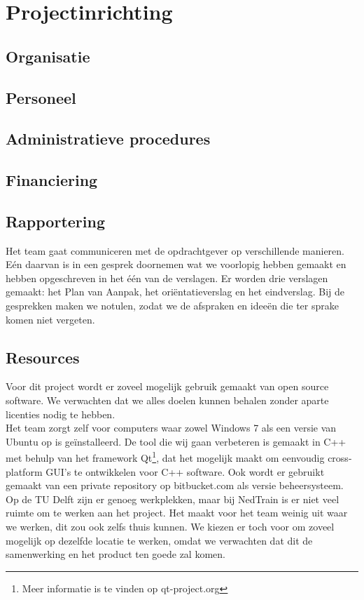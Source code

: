 \section{Projectinrichting}
\subsection{Organisatie}
\subsection{Personeel}
\subsection{Administratieve procedures}
\subsection{Financiering}
\subsection{Rapportering}
Het team gaat communiceren met de opdrachtgever op verschillende manieren. E\'en daarvan is in een gesprek doornemen wat we voorlopig hebben gemaakt en hebben opgeschreven in het \'e\'en van de verslagen. Er worden drie verslagen gemaakt: het Plan van Aanpak, het ori\"entatieverslag en het eindverslag. Bij de gesprekken maken we notulen, zodat we de afspraken en idee\"en die ter sprake komen niet vergeten.

\subsection{Resources}
Voor dit project wordt er zoveel mogelijk gebruik gemaakt van open source software. We verwachten dat we alles doelen kunnen behalen zonder aparte licenties nodig te hebben. \\

Het team zorgt zelf voor computers waar zowel Windows 7 als een versie van Ubuntu op is ge\"installeerd. De tool die wij gaan verbeteren is gemaakt in C++ met behulp van het framework Qt\footnote{Meer informatie is te vinden op qt-project.org}, dat het mogelijk maakt om eenvoudig cross-platform GUI's te ontwikkelen voor C++ software. Ook wordt er gebruikt gemaakt van een private repository op bitbucket.com als versie beheersysteem. \\

Op de TU Delft zijn er genoeg werkplekken, maar bij NedTrain is er niet veel ruimte om te werken aan het project. Het maakt voor het team weinig uit waar we werken, dit zou ook zelfs thuis kunnen. We kiezen er toch voor om zoveel mogelijk op dezelfde locatie te werken, omdat we verwachten dat dit de samenwerking en het product ten goede zal komen. 
